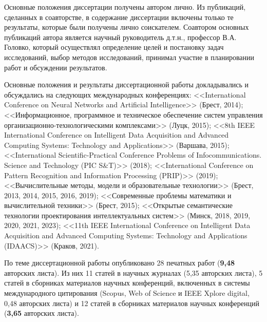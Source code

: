 \vspace{3mm}
\contribution
\vspace{3mm}

Основные положения диссертации получены автором лично. Из публикаций, сделанных в соавторстве, в содержание диссертации включены только те результаты, которые были получены лично соискателем. Соавтором основных публикаций автора является научный руководитель д.т.н., профессор В.А. Головко, который осуществлял определение целей и постановку задач исследований, выбор методов исследований, принимал участие в планировании работ и обсуждении результатов. 

\vspace{3mm}
\probation
\vspace{3mm}

Основные положения и результаты диссертационной работы докладывались и обсуждались на следующих международных конференциях: <<International Conference on Neural Networks and Artificial Intelligence>> (Брест, 2014); <<Информационное, программное и техническое обеспечение систем управления организационно-технологическими комплексами>> (Луцк, 2015); <<8th IEEE International Conference on Intelligent Data Acquisition and Advanced Computing Systems: Technology and Applications>> (Варшава, 2015); <<International Scientific-Practical Conference Problems of Infocommunications. Science and Technology (PIC S\&T)>> (2018); <<International Conference on Pattern Recognition and Information Processing (PRIP)>> (2019); <<Вычислительные методы, модели и образовательные технологии>> (Брест, 2013, 2014, 2015, 2016, 2019); <<Современные проблемы математики и вычислительной техники>> (Брест, 2015); <<Открытые семантические технологии проектирования интеллектуальных систем>> (Минск, 2018, 2019, 2020, 2021, 2023); <<11th IEEE International Conference on Intelligent Data Acquisition and Advanced Computing Systems: Technology and Applications (IDAACS)>> (Краков, 2021).



\vspace{3mm}
\publications
\vspace{3mm}

По теме диссертационной работы опубликовано 28 печатных работ (\textbf{9,48} авторских листа). Из них 11 статей в научных журналах (5,35 авторских листа), 5 статей в сборниках материалов научных конференций, включенных в системы международного цитирования (Scopus, Web of Science и IEEE Xplore digital, 0,48 авторских листа) и 12 статей в сборниках материалов научных конференций (\textbf{3,65} авторских листа).

